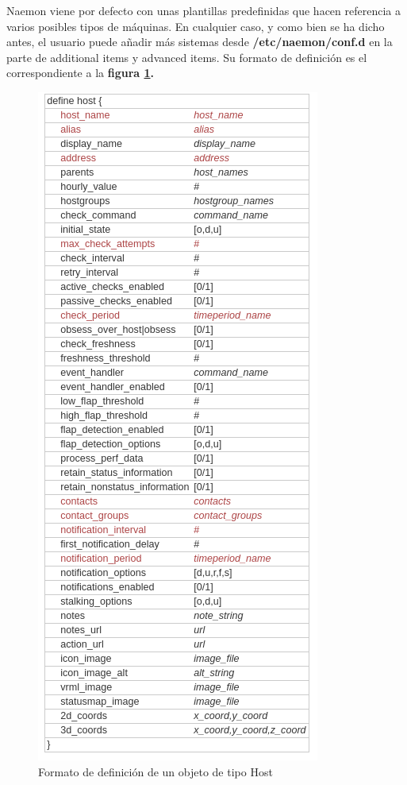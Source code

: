 Naemon viene por defecto con unas plantillas predefinidas que hacen referencia a varios posibles tipos de máquinas. En cualquier caso, y como bien se ha dicho antes, el usuario puede añadir más sistemas desde \textbf{/etc/naemon/conf.d} en la parte de additional items y advanced
items. Su formato de definición es el correspondiente a la \textbf{figura \ref{define-hosts}.}
\begin{figure}[H]
	\centering
	\includegraphics[scale=0.4]{imagenes/definicion_objetos/hosts.png}
	\caption{Formato de definición de un objeto de tipo Host} \label{define-hosts}	
\end{figure}

